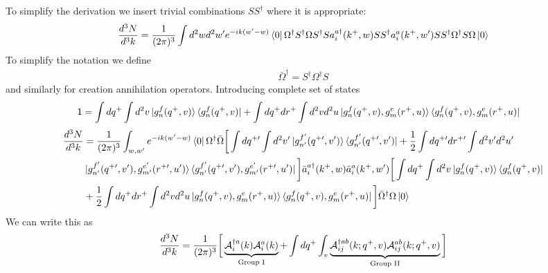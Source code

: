 \documentclass[aps,prd,amsmath,amssymb,nofootinbib]{revtex4-2}
\numberwithin{equation}{section}
\begin{document}
To simplify the derivation we insert trivial combinations $S S^\dagger$ where it is appropriate: 
\begin{equation}
\frac{d^3  N}{d^3 k} = \frac{1}{(2\pi)^{3}}\int  d^{2}w d^{2} w^\prime 
e^{-ik (w^{\prime}-w)}
\bra{0}\Omega^{\dagger} S^{\dagger}\Omega  S^\dagger  S a^{a\dagger}_{i}(k^{+},w) 
 S S^\dagger a^{a}_{i} (k^{+} , w^\prime)  S S^\dagger  \Omega^{\dagger} S\Omega\ket{0}
\end{equation}
To simplify the notation we define 
\begin{align}
   \bar \Omega^\dagger =  S^\dagger \Omega^\dagger S  
\end{align}
and similarly for creation annihilation operators. Introducing complete set of states
\begin{align}
    \mathsf{1} & = \int dq^{+} \int d^{2}v \ket{g^{f}_{n}(q^{+},v)}\bra{g^{f}_{n}(q^{+},v)} + \int dq^{+} dr^{+} \int d^{2}v d^{2}u \ket{g^{f}_{n}(q^{+},v),g^{e}_{m}(r^{+},u)}\bra{g^{f}_{n}(q^{+},v),g^{e}_{m}(r^{+},u)}
\end{align}  
\begin{align}
\frac{d^3  N}{d^3 k} &  = \frac{1}{(2\pi)^{3}}\int_{w,w^\prime} e^{-i k (w^{\prime}-w)}\bra{0}\Omega^{\dagger}\bar{\Omega} \bigg[ \int dq^{+\prime} \int d^{2}v^{\prime} \ket{g^{f^{\prime}}_{n^{\prime}}(q^{+\prime},v^{\prime})}\bra{g^{f^{\prime}}_{n^{\prime}}(q^{+\prime},v^{\prime})}  + \frac{1}{2}\int dq^{+\prime} dr^{+\prime} \int d^{2}v^{\prime} d^{2}u^{\prime} \notag \\ &\ket{g^{f^{\prime}}_{n^{\prime}}(q^{+\prime},v^{\prime}),g^{e^{\prime}}_{m^{\prime}}(r^{+\prime},u^{\prime})}\bra{g^{f^{\prime}}_{n^{\prime}}(q^{+\prime},v^{\prime}),g^{e^{\prime}}_{m^{\prime}}(r^{+\prime},u^{\prime})}\bigg]\bar a^{a\dagger }_{i} (k^{+} , w)\bar a^{a}_{i} (k^{+} , w^\prime)\bigg[ \int dq^{+} \int d^{2}v \ket{g^{f}_{n}(q^{+},v)}\bra{g^{f}_{n}(q^{+},v)} \notag \\ & + \frac{1}{2}\int dq^{+} dr^{+} \int d^{2}v d^{2}u \ket{g^{f}_{n}(q^{+},v),g^{e}_{m}(r^{+},u)}\bra{g^{f}_{n}(q^{+},v),g^{e}_{m}(r^{+},u)} \bigg]\bar \Omega^{\dagger} \Omega\ket{0}
\end{align}
We can write this as
\begin{equation}
    \frac{d^3  N}{d^3 k}   = \frac{1}{(2\pi)^{3}}\bigg[\underbrace{{\cal A}^{\dagger a}_{i}(k){\cal A}^{a}_{i}(k)}_{\text{Group I}} + 
    \int dq^+ \int_v
    \underbrace{{\cal A}^{\dagger ab}_{ij}(k; q^+, v){\cal A}^{ab}_{ij}(k; q^+, v)}_{\text{Group II}}\bigg]
\end{equation}
\end{document}
